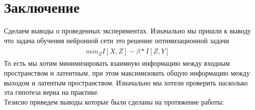 \section{Заключение}
Сделаем выводы о проведенных экспериментах. Изначально мы пришли к выводу что задача обучения нейронной сети это решение оптимизационной задачи
\begin{gather}
\begin{aligned}
min_{Z} I[X, Z] - \beta * I[Z, Y]
\end{aligned}
\end{gather}
То есть мы хотим минимизировать взаимную информацию между входным  пространством и латентным, при этом максимизовать общую информацию между выходом и латентым пространством. Изначально мы хотели проверить насколько эта гипотеза верна на практике. \\
Тезисно приведем выводы которые были сделаны на протяжение работы:
